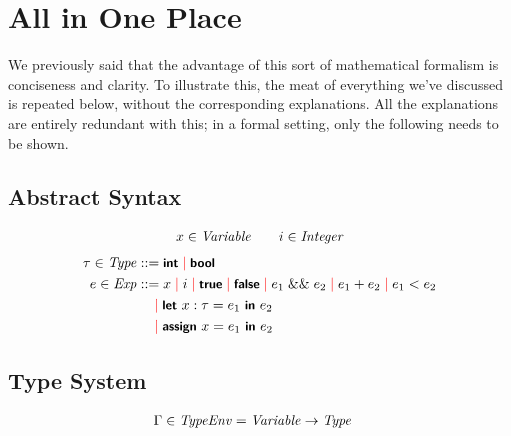 \section{All in One Place}
We previously said that the advantage of this sort of mathematical formalism is conciseness and clarity.
To illustrate this, the meat of everything we've discussed is repeated below, without the corresponding explanations.
All the explanations are entirely redundant with this; in a formal setting, only the following needs to be shown.

\subsection{Abstract Syntax}

\begin{gather*}
  x \in \mtt{Variable} \qquad i \in \mtt{Integer}
\end{gather*}
\begin{align*}
  \tau \in \mtt{Type} &::= \kw{int} \alt \kw{bool}\\
  e \in \mtt{Exp} &::= x \alt i \alt \kw{true} \alt \kw{false} \alt e_1 \;\&\&\; e_2 \alt e_1 + e_2 \alt e_1 < e_2\\
  &\lalt \kw{let } x: \tau = e_1 \kw{ in } e_2\\
  &\lalt \kw{assign } x = e_1 \kw{ in } e_2
\end{align*}

\subsection{Type System}
\begin{align*}
  \Gamma \in \mtt{TypeEnv} &= \mtt{Variable} \to \mtt{Type}
\end{align*}

